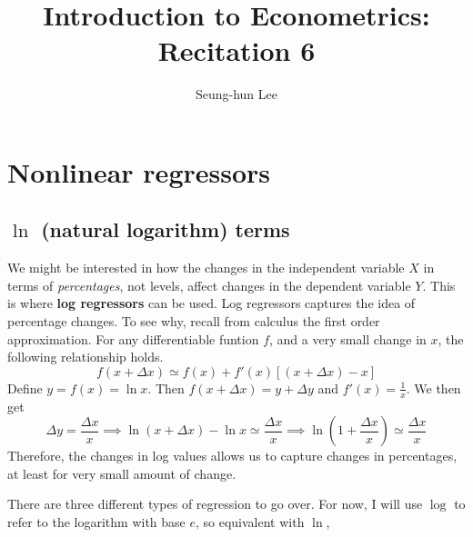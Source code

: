 \documentclass[12pt]{article}
\title{Introduction to Econometrics: Recitation 6}
\theoremstyle{definition}
\theoremstyle{property}
\theoremstyle{assumption}
\theoremstyle{example}
\theoremstyle{comment}
\begin{document}
\linespread{1.25}
\author{Seung-hun Lee}
\date{}
\maketitle
\section{Nonlinear regressors}
\subsection{$\ln$ (natural logarithm) terms}
We might be interested in how the changes in the independent variable $X$ in terms of \textit{percentages}, not levels, affect changes in the dependent variable $Y$. This is where \textbf{log regressors} can be used. Log regressors captures the idea of percentage changes. To see why, recall from calculus the first order approximation. For any differentiable funtion $f$, and a very small change in $x$, the following relationship holds. 
\[
f(x+\Delta x) \simeq f(x)+f'(x)[(x+\Delta x) -x] 
\]
Define $y=f(x)=\ln{x}$. Then $f(x+\Delta x) = y+\Delta y$ and $f'(x)=\frac{1}{x}$. We then get 
\[
\Delta y = \frac{\Delta x}{x}\implies \ln{(x+\Delta x)}-\ln{x} \simeq \frac{\Delta x}{x} \implies \ln\left(1+\frac{\Delta x}{x}\right)\simeq\frac{\Delta x}{x}
\]
Therefore, the changes in log values allows us to capture changes in percentages, at least for very small amount of change. \par\medskip
There are three different types of regression to go over. For now, I will use $\log$ to refer to the logarithm with base $e$, so equivalent with $\ln$, 
\end{document}
